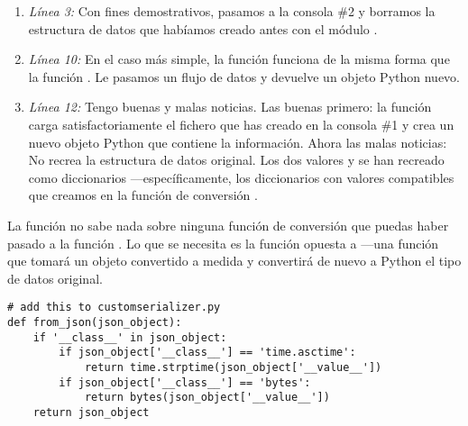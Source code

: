 \begin{enumerate}

\item \emph{Línea 3:} Con fines demostrativos, pasamos a la consola \#2 y borramos la estructura de datos  que habíamos creado antes con el módulo .

\item \emph{Línea 10:} En el caso más simple, la función  funciona de la misma forma que la función . Le pasamos un flujo de datos y devuelve un objeto Python nuevo.

\item \emph{Línea 12:} Tengo buenas y malas noticias. Las buenas primero: la función  carga satisfactoriamente el fichero que has creado en la consola \#1 y crea un nuevo objeto Python que contiene la información. Ahora las malas noticias: No recrea la estructura de datos  original. Los dos valores  y  se han recreado como diccionarios ---específicamente, los diccionarios con valores compatibles  que creamos en la función de conversión .

\end{enumerate}

La función  no sabe nada sobre ninguna función de conversión que puedas haber pasado a la función . Lo que se necesita es la función opuesta a  ---una función que tomará un objeto  convertido a medida y convertirá de nuevo a Python el tipo de datos original.

\noindent\begin{minipage}{\textwidth}
\begin{lstlisting}[mathescape=True]
# add this to customserializer.py
def from_json(json_object):
    if '__class__' in json_object:
        if json_object['__class__'] == 'time.asctime':
            return time.strptime(json_object['__value__'])
        if json_object['__class__'] == 'bytes':
            return bytes(json_object['__value__'])
    return json_object
\end{lstlisting}
\end{minipage}

